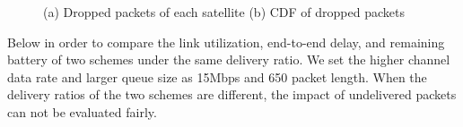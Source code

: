 \begin{figure}[htp]
\caption{ (a) Dropped packets of each satellite (b) CDF of dropped packets}
\label{fig:DROPPED}
\end{figure}

Below in order to compare the link utilization, end-to-end delay, and remaining battery of two schemes under the same delivery ratio.  We set the higher channel data rate and larger queue size as 15Mbps and 650 packet length. When the delivery ratios of the two schemes are different, the impact of undelivered packets can  not be evaluated fairly.


